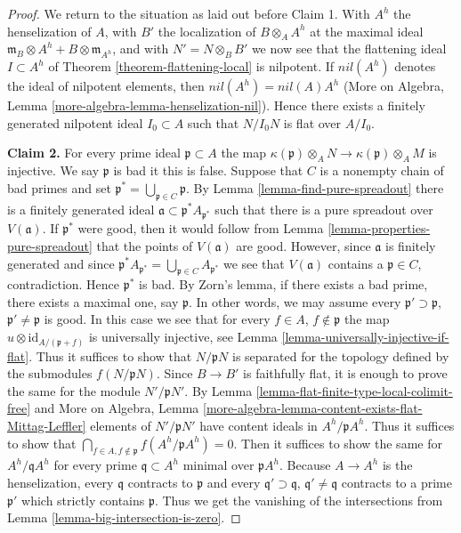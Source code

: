 \begin{proof}
\medskip\noindent
We return to the situation as laid out before Claim 1. With
$A^h$ the henselization of $A$, with $B'$ the localization
of $B \otimes_A A^h$ at the maximal ideal
$\mathfrak m_B \otimes A^h + B \otimes \mathfrak m_{A^h}$, and with
$N' = N \otimes_B B'$ we now see that the flattening ideal $I \subset A^h$
of Theorem \ref{theorem-flattening-local} is nilpotent.
If $nil(A^h)$ denotes the ideal of nilpotent elements, then
$nil(A^h) = nil(A) A^h$
(More on Algebra, Lemma \ref{more-algebra-lemma-henselization-nil}).
Hence there exists a finitely generated
nilpotent ideal $I_0 \subset A$ such that $N/I_0N$ is flat over $A/I_0$.

\medskip\noindent
{\bf Claim 2.} For every prime ideal $\mathfrak p \subset A$
the map
$\kappa(\mathfrak p) \otimes_A N \to \kappa(\mathfrak p) \otimes_A M$
is injective. We say $\mathfrak p$ is bad it this is false.
Suppose that $C$ is a nonempty chain of bad primes and set
$\mathfrak p^* = \bigcup_{\mathfrak p \in C} \mathfrak p$.
By Lemma \ref{lemma-find-pure-spreadout}
there is a finitely generated ideal
$\mathfrak a \subset \mathfrak p^*A_{\mathfrak p^*}$
such that there is a pure spreadout over $V(\mathfrak a)$.
If $\mathfrak p^*$ were good, then it would follow from
Lemma \ref{lemma-properties-pure-spreadout}
that the points of $V(\mathfrak a)$ are good.
However, since $\mathfrak a$ is finitely generated and since
$\mathfrak p^*A_{\mathfrak p^*} = \bigcup_{\mathfrak p \in C}A_{\mathfrak p^*}$
we see that $V(\mathfrak a)$ contains a $\mathfrak p \in C$, contradiction.
Hence $\mathfrak p^*$ is bad. By Zorn's lemma, if there exists a
bad prime, there exists a maximal one, say $\mathfrak p$.
In other words, we may assume every $\mathfrak p' \supset \mathfrak p$,
$\mathfrak p' \not = \mathfrak p$ is good.
In this case we see that for every $f \in A$, $f \not \in \mathfrak p$
the map $u \otimes \text{id}_{A/(\mathfrak p + f)}$ is universally
injective, see Lemma \ref{lemma-universally-injective-if-flat}.
Thus it suffices to show that $N/\mathfrak p N$ is separated
for the topology defined by the submodules $f(N/\mathfrak pN)$.
Since $B \to B'$ is faithfully flat, it is enough to prove the
same for the module $N'/\mathfrak p N'$.
By Lemma \ref{lemma-flat-finite-type-local-colimit-free} and
More on Algebra, Lemma
\ref{more-algebra-lemma-content-exists-flat-Mittag-Leffler}
elements of $N'/\mathfrak pN'$ have content ideals in $A^h/\mathfrak pA^h$.
Thus it suffices to show that
$\bigcap_{f \in A, f \not \in \mathfrak p} f(A^h/\mathfrak p A^h) = 0$.
Then it suffices to show the same for
$A^h/\mathfrak q A^h$ for every prime $\mathfrak q \subset A^h$
minimal over $\mathfrak p A^h$. Because $A \to A^h$ is the henselization,
every $\mathfrak q$ contracts to $\mathfrak p$ and every
$\mathfrak q' \supset \mathfrak q$, $\mathfrak q' \not = \mathfrak q$
contracts to a prime $\mathfrak p'$ which strictly contains $\mathfrak p$.
Thus we get the vanishing of the intersections from
Lemma \ref{lemma-big-intersection-is-zero}.


\end{proof}
